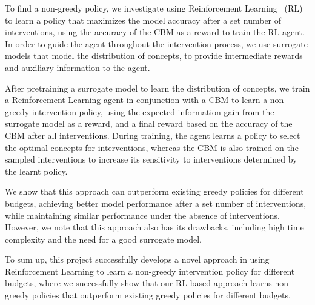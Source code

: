 \documentclass[../main.tex]{subfiles}
\begin{document}
To find a non-greedy policy, we investigate using Reinforcement Learning~\cite{rl} (RL) 
to learn a policy that maximizes
the model accuracy after a set number of interventions,
using the accuracy of the CBM as a reward to train the RL agent.
In order
to guide the agent throughout the intervention process,
we use surrogate models that model the distribution of concepts,
to provide intermediate rewards and auxiliary information to the agent.

After pretraining a surrogate model to learn the distribution of concepts,
we train a Reinforcement Learning agent in conjunction with a CBM to learn a 
non-greedy intervention policy, using
the expected information gain from the surrogate model
as a reward, and a final reward based on the 
accuracy of the CBM after all interventions.
During training,
the agent learns a policy to select
the optimal concepts for interventions,
whereas the CBM is also trained on the sampled interventions
to increase its sensitivity to interventions determined by 
the learnt policy.

We show that this approach can outperform existing greedy policies
for different budgets, achieving better model performance
after a set number of interventions, 
while maintaining similar performance under 
the absence of interventions. However, we note that
this approach also has its drawbacks, including high time complexity
and the need for a good surrogate model.

To sum up, this project successfully develops a novel approach in using
Reinforcement Learning to learn a non-greedy intervention policy 
for different budgets,
where we successfully show that our RL-based approach
learns non-greedy policies that outperform existing
greedy policies for different budgets.

\end{document}
